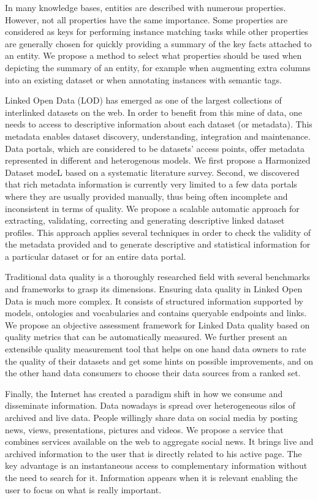 In many knowledge bases, entities are described with numerous properties. However, not all properties have the same importance. Some properties are considered as keys for performing instance matching tasks while other properties are generally chosen for quickly providing a summary of the key facts attached to an entity. We propose a method to select what properties should be used when depicting the summary of an entity, for example when augmenting extra columns into an existing dataset or when annotating instances with semantic tags.

Linked Open Data (LOD) has emerged as one of the largest collections of interlinked datasets on the web. In order to benefit from this mine of data, one needs to access to descriptive information about each dataset (or metadata). This metadata enables dataset discovery, understanding, integration and maintenance. Data portals, which are considered to be datasets' access points, offer metadata represented in different and heterogenous models. We first propose a Harmonized Dataset modeL based on a systematic literature survey. Second, we discovered that rich metadata information is currently very limited to a few data portals where they are usually provided manually, thus being often incomplete and inconsistent in terms of quality. We propose a scalable automatic approach for extracting, validating, correcting and generating descriptive linked dataset profiles. This approach applies several techniques in order to check the validity of the metadata provided and to generate descriptive and statistical information for a particular dataset or for an entire data portal.

Traditional data quality is a thoroughly researched field with several benchmarks and frameworks to grasp its dimensions. Ensuring data quality in Linked Open Data is much more complex. It consists of structured information supported by models, ontologies and vocabularies and contains queryable endpoints and links. We propose an objective assessment framework for Linked Data quality based on quality metrics that can be automatically measured. We further present an extensible quality measurement tool that helps on one hand data owners to rate the quality of their datasets and get some hints on possible improvements, and on the other hand data consumers to choose their data sources from a ranked set.

Finally, the Internet has created a paradigm shift in how we consume and disseminate information. Data nowadays is spread over heterogeneous silos of archived and live data. People willingly share data on social media by posting news, views, presentations, pictures and videos. We propose a service that combines services available on the web to aggregate social news. It brings live and archived information to the user that is directly related to his active page. The key advantage is an instantaneous access to complementary information without the need to search for it. Information appears when it is relevant enabling the user to focus on what is really important.